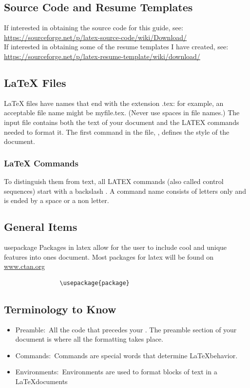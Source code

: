 \documentclass[12pt,hidelinks]{article}
\begin{document}
	\subsection{Source Code and Resume Templates}
			If interested in obtaining the source code for this guide, see:\\
			\url{https://sourceforge.net/p/latex-source-code/wiki/Download/}\\
			If interested in obtaining some of the resume templates I have created, see:\\ \url{https://sourceforge.net/p/latex-resume-template/wiki/download/}
	\subsection{LaTeX Files}
			LaTeX files have names that end with the extension .tex: for example, an acceptable file name might be myfile.tex. (Never use spaces in file names.) The input file contains both the text of your document and the LATEX commands needed to format it. The first command in the file, , defines the style of the document.
	\subsubsection{LaTeX Commands}
			To distinguish them from text, all LATEX commands (also called control sequences) start with a backslash \cs. A command name consists of letters only and is ended by a space or a non letter.
	\subsection{General Items}
		\begin{docCommand}{usepackage}{}
			Packages in latex allow for the user to include cool and unique features into ones document. Most packages for latex will be found on \url{www.ctan.org}
			\begin{verbatim}
				\usepackage{package}
			\end{verbatim}
		\end{docCommand}
	\subsection{Terminology to Know}
			\begin{itemize}
				\item Preamble:\, All the code that precedes your . The preamble section of your document is where all the formatting takes place. 
				\item Commands:\, Commands are special words that determine \LaTeX behavior.
				\item Environments:\, Environments are used to format blocks of text in a \LaTeX documents
			\end{itemize}
\end{document}
